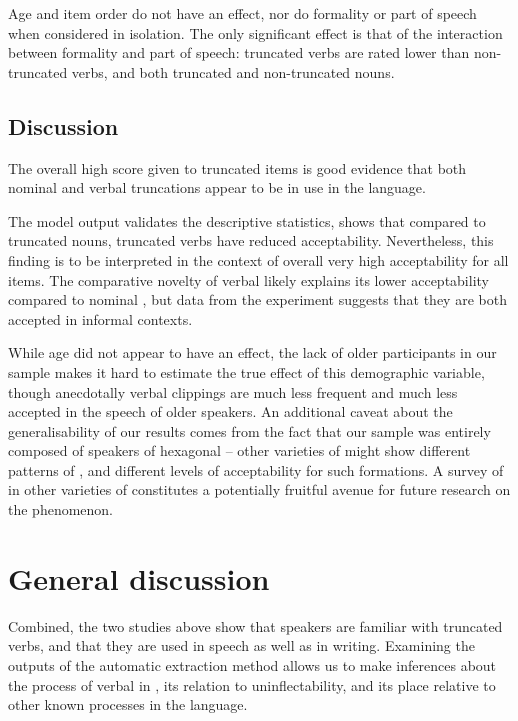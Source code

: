 \documentclass[output=paper,colorlinks,citecolor=brown]{langscibook}
\begin{document}
Age and item order do not have an effect, nor do formality or part of speech when considered in isolation. The only significant effect is that of the interaction between formality and part of speech: truncated verbs are rated lower than non-truncated verbs, and both truncated and non-truncated nouns.

\subsection{Discussion}

The overall high score given to truncated items is good evidence that both nominal and verbal truncations appear to be in use in the  language. 

The model output validates the descriptive statistics, shows that compared to truncated nouns, truncated verbs have reduced acceptability. Nevertheless, this finding is to be interpreted in the context of overall very high acceptability for all items. The comparative novelty of verbal  likely explains its lower acceptability compared to nominal , but data from the experiment suggests that they are both accepted in informal contexts.

While age did not appear to have an effect, the lack of older participants in our sample makes it hard to estimate the true effect of this demographic variable, though anecdotally verbal clippings are much less frequent and much less accepted in the speech of older  speakers. An additional caveat about the generalisability of our results comes from the fact that our sample was entirely composed of speakers of hexagonal  -- other varieties of  might show different patterns of , and different levels of acceptability for such formations. A survey of  in other varieties of  constitutes a potentially fruitful avenue for future research on the phenomenon.

\section{General discussion}\label{sec:disc}
Combined, the two studies above show that speakers are familiar with truncated verbs, and that they are used in speech as well as in writing. Examining the outputs of the automatic  extraction method allows us to make inferences about the process of verbal  in , its relation to uninflectability, and its place relative to other known  processes in the language.
\end{document}
